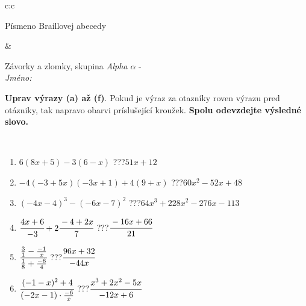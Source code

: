 \documentclass[10pt]{report}
\begin{document}
\begin{tabular}{c:c}
\begin{minipage}[c][104.5mm][t]{0.5\linewidth}
\begin{center}
\begin{minipage}{0.20\linewidth}
\begin{center}
{\small Písmeno Braillovej abecedy}
\end{center}
\end{minipage}
\end{center}
\end{minipage}
&
\begin{minipage}[c][104.5mm][t]{0.5\linewidth}
\begin{center}
\vspace{7mm}
{\huge Závorky a zlomky, skupina \textit{Alpha $\alpha$} -}\\[5mm]
\textit{Jméno:}\phantom{xxxxxxxxxxxxxxxxxxxxxxxxxxxxxxxxxxxxxxxxxxxxxxxxxxxxxxxxxxxxxxxxx}\\[5mm]
\begin{minipage}{0.95\linewidth}
\begin{center}
\textbf{Uprav výrazy (a) až (f)}. Pokud je výraz za otazníky roven výrazu pred otázniky, tak napravo obarvi príslušející kroužek. \textbf{Spolu odevzdejte výsledné slovo.}
\end{center}
\end{minipage}
\\[1mm]
\begin{minipage}{0.79\linewidth}
\begin{center}
\begin{varwidth}{\linewidth}
\begin{enumerate}
\normalsize
\item $6(8x+5)-3(6-x)$\quad \dotfill\; ???\;\dotfill \quad $51x+12$
\item $-4(-3+5x)(-3x+1)+4(9+x)$\quad \dotfill\; ???\;\dotfill \quad $60x^2-52x+48$
\item $(-4x-4)^3-(-6x-7)^2$\quad \dotfill\; ???\;\dotfill \quad $64x^3+228x^2-276x-113$
\item $\cfrac{4x+6}{-3}+2\cfrac{-4+2x}{7}$\quad \dotfill\; ???\;\dotfill \quad $\cfrac{-16x+66}{21}$
\item $\cfrac{\frac{3}{1}-\frac{-1}{x}}{\frac{1}{8}+\frac{-6}{4}}$\quad \dotfill\; ???\;\dotfill \quad $\cfrac{96x+32}{-44x}$
\item $\cfrac{(-1-x)^2+4}{(-2x-1)\cdot\frac{-6}{x}}$\quad \dotfill\; ???\;\dotfill \quad $\cfrac{x^3+2x^2-5x}{-12x+6}$
\end{enumerate}
\end{varwidth}
\end{center}
\end{minipage}
\begin{minipage}{0.20\linewidth}
\begin{center}

\end{center}
\end{minipage}
\end{center}
\end{minipage}
\end{tabular}
\end{document}
